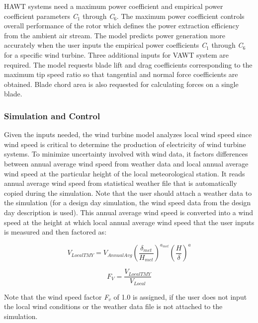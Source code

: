 HAWT systems need a maximum power coefficient and empirical power coefficient parameters \emph{C\(_{1}\)} through \emph{C\(_{6}\)}. The maximum power coefficient controls overall performance of the rotor which defines the power extraction efficiency from the ambient air stream. The model predicts power generation more accurately when the user inputs the empirical power coefficients \emph{C\(_{1}\)} through \emph{C\(_{6}\)} for a specific wind turbine. Three additional inputs for VAWT system are required. The model requests blade lift and drag coefficients corresponding to the maximum tip speed ratio so that tangential and normal force coefficients are obtained. Blade chord area is also requested for calculating forces on a single blade.

\subsubsection{Simulation and Control}\label{simulation-and-control-002}

Given the inputs needed, the wind turbine model analyzes local wind speed since wind speed is critical to determine the production of electricity of wind turbine systems. To minimize uncertainty involved with wind data, it factors differences between annual average wind speed from weather data and local annual average wind speed at the particular height of the local meteorological station. It reads annual average wind speed from statistical weather file that is automatically copied during the simulation. Note that the user should attach a weather data to the simulation (for a design day simulation, the wind speed data from the design day description is used). This annual average wind speed is converted into a wind speed at the height at which local annual average wind speed that the user inputs is measured and then factored as:

\begin{equation}
{V_{LocalTMY}} = {V_{AnnualAvg}}{\left( {\frac{{{\delta_{met}}}}{{{H_{met}}}}} \right)^{{a_{met}}}}{\left( {\frac{H}{\delta }} \right)^a}
\end{equation}

\begin{equation}
{F_V} = \frac{{{V_{LocalTMY}}}}{{{V_{Local}}}}
\end{equation}

Note that the wind speed factor \emph{F\(_{v}\)} of 1.0 is assigned, if the user does not input the local wind conditions or the weather data file is not attached to the simulation.

